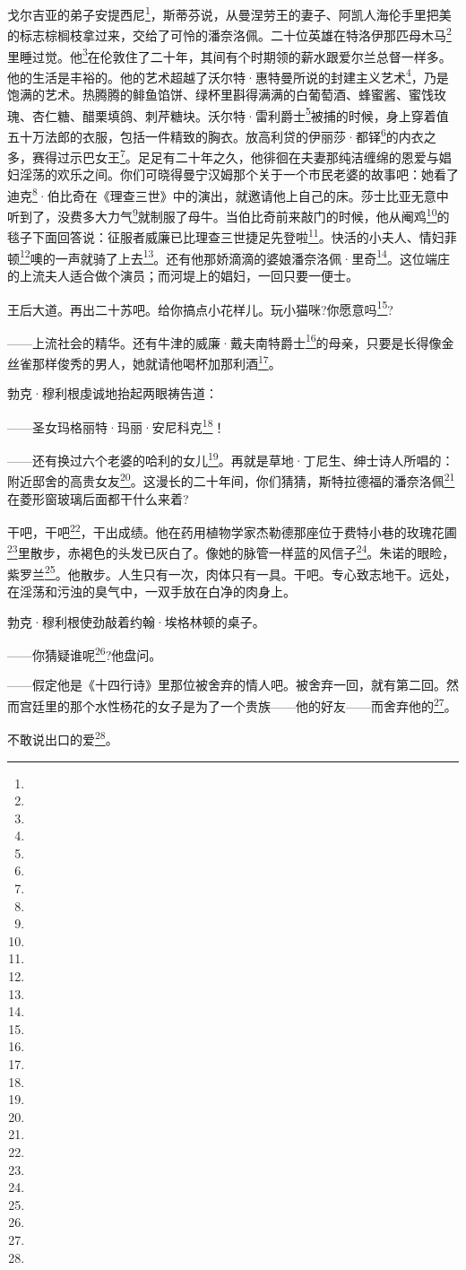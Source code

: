 \par 戈尔吉亚的弟子安提西尼\footnote{}，斯蒂芬说，从曼涅劳王的妻子、阿凯人海伦手里把美的标志棕榈枝拿过来，交给了可怜的潘奈洛佩。二十位英雄在特洛伊那匹母木马\footnote{}里睡过觉。他\footnote{}在伦敦住了二十年，其间有个时期领的薪水跟爱尔兰总督一样多。他的生活是丰裕的。他的艺术超越了沃尔特·惠特曼所说的封建主义艺术\footnote{}，乃是饱满的艺术。热腾腾的鲱鱼馅饼、绿杯里斟得满满的白葡萄酒、蜂蜜酱、蜜饯玫瑰、杏仁糖、醋栗填鸽、刺芹糖块。沃尔特·雷利爵士\footnote{}被捕的时候，身上穿着值五十万法郎的衣服，包括一件精致的胸衣。放高利贷的伊丽莎·都铎\footnote{}的内衣之多，赛得过示巴女王\footnote{}。足足有二十年之久，他徘徊在夫妻那纯洁缠绵的恩爱与娼妇淫荡的欢乐之间。你们可晓得曼宁汉姆那个关于一个市民老婆的故事吧：她看了迪克\footnote{}·伯比奇在《理查三世》中的演出，就邀请他上自己的床。莎士比亚无意中听到了，没费多大力气\footnote{}就制服了母牛。当伯比奇前来敲门的时候，他从阉鸡\footnote{}的毯子下面回答说：征服者威廉已比理查三世捷足先登啦\footnote{}。快活的小夫人、情妇菲顿\footnote{}噢的一声就骑了上去\footnote{}。还有他那娇滴滴的婆娘潘奈洛佩·里奇\footnote{}。这位端庄的上流夫人适合做个演员；而河堤上的娼妇，一回只要一便士。
\par 王后大道。再出二十苏吧。给你搞点小花样儿。玩小猫咪?你愿意吗\footnote{}?
\par ——上流社会的精华。还有牛津的威廉·戴夫南特爵士\footnote{}的母亲，只要是长得像金丝雀那样俊秀的男人，她就请他喝杯加那利酒\footnote{}。
\par 勃克·穆利根虔诚地抬起两眼祷告道：
\par ——圣女玛格丽特·玛丽·安尼科克\footnote{}！
\par ——还有换过六个老婆的哈利的女儿\footnote{}。再就是草地·丁尼生、绅士诗人所唱的：附近邸舍的高贵女友\footnote{}。这漫长的二十年间，你们猜猜，斯特拉德福的潘奈洛佩\footnote{}在菱形窗玻璃后面都干什么来着?
\par 干吧，干吧\footnote{}，干出成绩。他在药用植物学家杰勒德那座位于费特小巷的玫瑰花圃\footnote{}里散步，赤褐色的头发已灰白了。像她的脉管一样蓝的风信子\footnote{}。朱诺的眼睑，紫罗兰\footnote{}。他散步。人生只有一次，肉体只有一具。干吧。专心致志地干。远处，在淫荡和污浊的臭气中，一双手放在白净的肉身上。
\par 勃克·穆利根使劲敲着约翰·埃格林顿的桌子。
\par ——你猜疑谁呢\footnote{}?他盘问。
\par ——假定他是《十四行诗》里那位被舍弃的情人吧。被舍弃一回，就有第二回。然而宫廷里的那个水性杨花的女子是为了一个贵族——他的好友——而舍弃他的\footnote{}。
\par 不敢说出口的爱\footnote{}。
